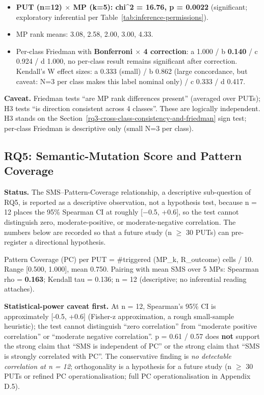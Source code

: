 \documentclass[manuscript,screen,review]{acmart}
\begin{document}
\begin{itemize}

\item
  \textbf{PUT (n=12) $\times$ MP (k=5): chi\^{}2 = 16.76, p = 0.0022}
  (significant; exploratory inferential per Table~\ref{tab:inference-permissions}).
\item
  MP rank means: 3.08, 2.58, 2.00, 3.00, 4.33.
\item
  Per-class Friedman with \textbf{Bonferroni $\times$ 4 correction}: a
  1.000 / b \textbf{0.140} / c 0.924 / d 1.000, no per-class
  result remains significant after correction. Kendall's W effect sizes:
  a 0.333 (small) / b 0.862 (large concordance, but caveat: N=3 per
  class makes this label nominal only) / c 0.333 / d 0.417.
\end{itemize}

\textbf{Caveat.} Friedman tests ``are MP rank differences present''
(averaged over PUTs); H3 tests ``is direction consistent across 4
classes''. These are logically independent. H3 stands on the Section~\ref{rq3-cross-class-consistency-and-friedman} sign
test; per-class Friedman is descriptive only (small N=3 per class).

\subsection{RQ5: Semantic-Mutation Score and Pattern Coverage}\label{rq4-sms-vs-pattern-coverage}

\textbf{Status.} The SMS--Pattern-Coverage relationship, a descriptive
sub-question of RQ5, is reported as a descriptive observation, not a
hypothesis test, because n = 12 places the 95\% Spearman CI at roughly
{[}$-$0.5, +0.6{]}, so the test cannot distinguish zero,
moderate-positive, or moderate-negative correlation. The numbers below
are recorded so that a future study (n $\geq$ 30 PUTs) can pre-register a directional
hypothesis.

Pattern Coverage (PC) per PUT = \#triggered (MP\_k, R\_outcome) cells /
10. Range {[}0.500, 1.000{]}, mean 0.750. Pairing with mean SMS over 5
MPs: Spearman rho = \textbf{0.163}; Kendall tau = 0.136; n = 12
(descriptive; no inferential reading attaches).

\textbf{Statistical-power caveat first.} At n = 12, Spearman's 95\% CI
is approximately {[}-0.5, +0.6{]} (Fisher-z approximation, a rough
small-sample heuristic); the test cannot distinguish ``zero
correlation'' from ``moderate positive correlation'' or ``moderate
negative correlation''. p = 0.61 / 0.57 does \textbf{not} support the
strong claim that ``SMS is independent of PC'' or the strong claim that
``SMS is strongly correlated with PC''. The conservative finding is
\emph{no detectable correlation at n = 12}; orthogonality is a
hypothesis for a future study (n $\geq$ 30 PUTs or refined PC operationalisation; full PC
operationalisation in Appendix D.5).
\end{document}
